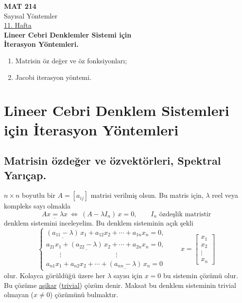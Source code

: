 \documentclass[11pt,a4paper]{article}
\begin{document}

\begin{center}
  {\Large\bfseries MAT 214}\\[2mm]
  Sayısal Yöntemler\\[4mm]
  \underline{11. Hafta}\\[6mm]
  \textbf{Lineer Cebri Denklemler Sistemi için\\ İterasyon Yöntemleri.}
\end{center}

\begin{enumerate}[label=\arabic*)]
  \item Matrisin öz değer ve öz fonksiyonları;
  \item Jacobi iterasyon yöntemi.
\end{enumerate}

\section{Lineer Cebri Denklem Sistemleri için İterasyon Yöntemleri}
\subsection{Matrisin özdeğer ve özvektörleri, Spektral Yarıçap.}
$n\times n$ boyutlu bir $A=[a_{ij}]$ matrisi verilmiş olsun. Bu matris için, $\lambda$ reel veya kompleks sayı olmakla
\[ \underline{Ax=\lambda x} \ \Leftrightarrow\ (A-\lambda I_n)\,x=0, \qquad I_n \text{ özdeşlik matristir} \]
denklem sistemini inceleyelim. Bu denklem sisteminin açık şekli
\[
  \begin{cases}
    \underline{(a_{11}-\lambda)}\,x_1+a_{12}x_2+\cdots+a_{1n}x_n=0,\\
    a_{21}x_1+\underline{(a_{22}-\lambda)}\,x_2+\cdots+a_{2n}x_n=0,\\
    \qquad\vdots\qquad\qquad\qquad\qquad\vdots\\
    a_{n1}x_1+a_{n2}x_2+\cdots+\underline{(a_{nn}-\lambda)}\,x_n=0
  \end{cases}
  \qquad x=\begin{bmatrix}x_1\\x_2\\\vdots\\x_n\end{bmatrix}
\]
olur. Kolayca görüldüğü üzere her $\lambda$ sayısı için $x=0$ bu sistemin çözümü olur. Bu çözüme
\underline{aşikar} (\underline{trivial}) çözüm denir. Maksat bu denklem sisteminin trivial olmayan
($x\neq 0$) çözümünü bulmaktır.
\end{document}

